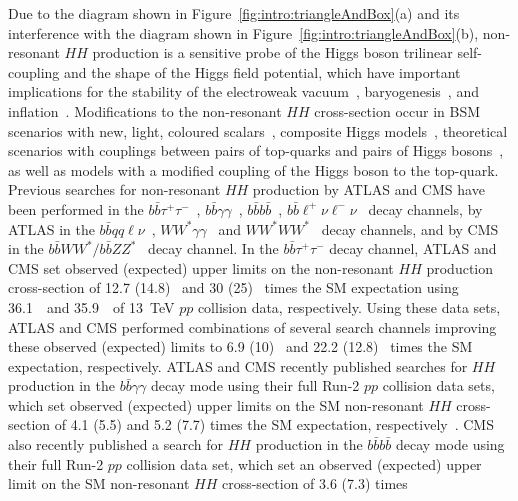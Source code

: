 \documentclass[twoside,11pt]{report}
\begin{document}
Due to the diagram shown in Figure~\ref{fig:intro:triangleAndBox}(a) and its interference 
with the diagram shown in Figure~\ref{fig:intro:triangleAndBox}(b), non-resonant $HH$ production is 
a sensitive probe of the Higgs boson trilinear self-coupling and the shape of the Higgs field potential, 
which have important implications for the stability of the electroweak vacuum~\cite{Branchina:2008pc,Buttazzo:2013uya}, 
baryogenesis~\cite{Reichert:2017puo}, and inflation~\cite{Bezrukov:2007ep,Masina:2011aa}. 
Modifications to the non-resonant $HH$ cross-section occur in BSM scenarios with new, 
light, coloured scalars~\cite{Kribs:2012kz}, composite Higgs models~\cite{Grober:2010yv}, 
theoretical scenarios with couplings between pairs of top-quarks and pairs of Higgs bosons~\cite{Contino:2012xk}, 
as well as models with a modified coupling of the Higgs boson to the top-quark. 
Previous searches for non-resonant $HH$ production by ATLAS and CMS have been performed in 
the $b\bar b\tau^+\tau^-$~\cite{HIGG-2016-16-witherratum,CMS-HIG-17-002}, 
$b\bar b\gamma\gamma$~\cite{HIGG-2016-15,Sirunyan:2020xok}, $b\bar bb\bar b$~\cite{EXOT-2016-31,CMS-HIG-17-017}, 
$b\bar b\ell^+\nu\ell^-\nu$~\cite{HDBS-2018-33,CMS-HIG-17-006} decay channels, 
by ATLAS in the $b\bar bqq\ell\nu$~\cite{HIGG-2016-27}, $WW^*\gamma\gamma$~\cite{HIGG-2016-20} 
and $WW^*WW^*$~\cite{HIGG-2016-24} decay channels, and by CMS in the $b\bar bWW^*/b\bar bZZ^*$~\cite{CMS-HIG-17-006} 
decay channel. In the $b\bar b\tau^+\tau^-$ decay channel, ATLAS and CMS set observed (expected) upper 
limits on the non-resonant $HH$ production cross-section of 12.7 (14.8)~\cite{HIGG-2016-16-witherratum} 
and 30 (25)~\cite{CMS-HIG-17-002} times the SM expectation using 36.1~\ifb\ and 35.9~\ifb\ of 
13~TeV $pp$ collision data, respectively. Using these data sets, ATLAS and CMS performed combinations of 
several search channels improving these observed (expected) limits to 6.9 (10)~\cite{HDBS-2018-58} 
and 22.2 (12.8)~\cite{CMS-HIG-17-030} times the SM expectation, respectively. 
ATLAS and CMS recently published searches for $HH$ production in the $b\bar b\gamma\gamma$ 
decay mode using their full Run-2 $pp$ collision data sets, which set observed (expected) 
upper limits on the SM non-resonant $HH$ cross-section of 4.1 (5.5) and 5.2 (7.7) times the SM expectation, 
respectively~\cite{ATLAS-CONF-2021-016,CMS:2020tkr}. CMS also recently published a search for $HH$ production 
in the $b\bar bb\bar b$ decay mode using their full Run-2 $pp$ collision data set, 
which set an observed (expected) upper limit on the SM non-resonant $HH$ cross-section of 3.6 (7.3) times 
\end{document}
